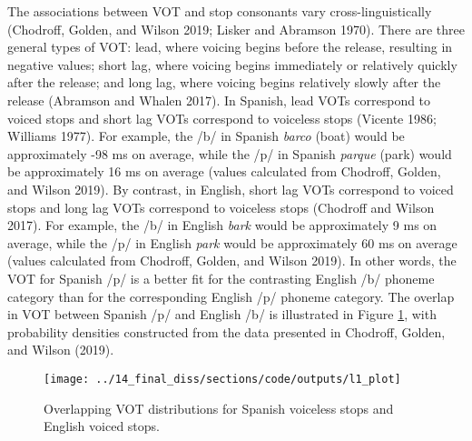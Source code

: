 \documentclass[
  preprint]{elsarticle}
\begin{document}
The associations between VOT and stop consonants vary cross-linguistically (Chodroff, Golden, and Wilson 2019; Lisker and Abramson 1970).
There are three general types of VOT: lead, where voicing begins before the release, resulting in negative values; short lag, where voicing begins immediately or relatively quickly after the release; and long lag, where voicing begins relatively slowly after the release (Abramson and Whalen 2017).
In Spanish, lead VOTs correspond to voiced stops and short lag VOTs correspond to voiceless stops (Vicente 1986; Williams 1977).
For example, the /b/ in Spanish \emph{barco} (boat) would be approximately -98 ms on average, while the /p/ in Spanish \emph{parque} (park) would be approximately 16 ms on average (values calculated from Chodroff, Golden, and Wilson 2019).
By contrast, in English, short lag VOTs correspond to voiced stops and long lag VOTs correspond to voiceless stops (Chodroff and Wilson 2017).
For example, the /b/ in English \emph{bark} would be approximately 9 ms on average, while the /p/ in English \emph{park} would be approximately 60 ms on average (values calculated from Chodroff, Golden, and Wilson 2019).
In other words, the VOT for Spanish /p/ is a better fit for the contrasting English /b/ phoneme category than for the corresponding English /p/ phoneme category.
The overlap in VOT between Spanish /p/ and English /b/ is illustrated in Figure \ref{fig:intro-fig}, with probability densities constructed from the data presented in Chodroff, Golden, and Wilson (2019).

\begin{figure}

{\centering \texttt{[image: ../14\_final\_diss/sections/code/outputs/l1\_plot]} 

}

\caption{Overlapping VOT distributions for Spanish voiceless stops and English voiced stops.}\label{fig:intro-fig}
\end{figure}
\end{document}
